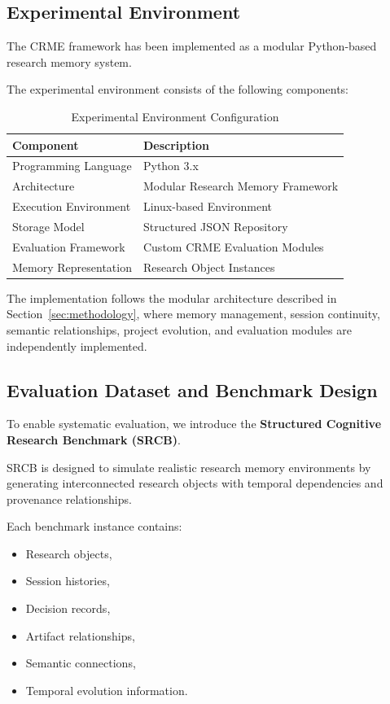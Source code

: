 \subsection{Experimental Environment}

The CRME framework has been implemented as a modular Python-based research memory system.

The experimental environment consists of the following components:

\begin{table}[h]
\centering
\caption{Experimental Environment Configuration}
\label{tab:experimental_environment}

\begin{tabular}{ll}
\hline
Component & Description\\
\hline
Programming Language & Python 3.x\\
Architecture & Modular Research Memory Framework\\
Execution Environment & Linux-based Environment\\
Storage Model & Structured JSON Repository\\
Evaluation Framework & Custom CRME Evaluation Modules\\
Memory Representation & Research Object Instances\\
\hline

\end{tabular}

\end{table}


The implementation follows the modular architecture described in Section~\ref{sec:methodology}, where memory management, session continuity, semantic relationships, project evolution, and evaluation modules are independently implemented.



\subsection{Evaluation Dataset and Benchmark Design}

To enable systematic evaluation, we introduce the \textbf{Structured Cognitive Research Benchmark (SRCB)}.

SRCB is designed to simulate realistic research memory environments by generating interconnected research objects with temporal dependencies and provenance relationships.

Each benchmark instance contains:

\begin{itemize}
    \item Research objects,
    \item Session histories,
    \item Decision records,
    \item Artifact relationships,
    \item Semantic connections,
    \item Temporal evolution information.
\end{itemize}


